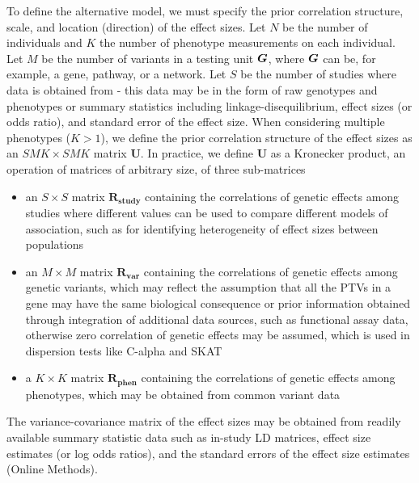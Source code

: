  To define the alternative model, we must specify the prior correlation structure, scale, and location (direction) of the effect sizes. Let $N$ be the number of individuals and $K$ the number of phenotype measurements on each individual. Let $M$ be the number of variants in a testing unit ${\boldsymbol G}$, where ${\boldsymbol G}$ can be, for example, a gene, pathway, or a network. Let $S$ be the number of studies where data is obtained from - this data may be in the form of raw genotypes and phenotypes or summary statistics including linkage-disequilibrium, effect sizes (or odds ratio), and standard error of the effect size. When considering multiple phenotypes ($K > 1$), we define the prior correlation structure of the effect sizes as an $SMK\times SMK$ matrix $\mathbf{U}$. In practice, we define $\mathbf{U}$ as a Kronecker product, an operation of matrices of arbitrary size, of three sub-matrices
\begin{itemize}
\item an $S\times S$ matrix $\mathbf{R_{\textrm{study}}}$ containing the correlations of genetic effects among studies where different values can be used to compare different models of association, such as for identifying heterogeneity of effect sizes between populations~\cite{band2013imputation}
\item an $M\times M$ matrix $\mathbf{R_{\textrm{var}}}$ containing the correlations of genetic effects among genetic variants, which may reflect the assumption that all the PTVs in a gene may have the same biological consequence\cite{macarthur,rivas2013assessing,rivas2015effect} or prior information obtained through integration of additional data sources, such as functional assay data\cite{majithia2014rare,findlay2014saturation}, otherwise zero correlation of genetic effects may be assumed, which is used in dispersion tests like C-alpha\cite{calpha,clarke2013flexible} and SKAT\cite{skat}
\item a $K\times K$ matrix $\mathbf{R_{\textrm{phen}}}$ containing the correlations of genetic effects among phenotypes, which may be obtained from common variant data\cite{cotsapas2011pervasive,solovieff2013pleiotropy,gencorr2015}
\end{itemize}
The variance-covariance matrix of the effect sizes may be obtained from readily available summary statistic data such as in-study LD matrices, effect size estimates (or log odds ratios), and the standard errors of the effect size estimates (Online Methods).

